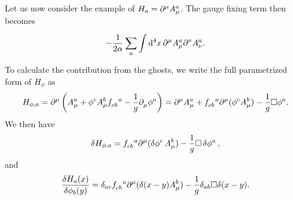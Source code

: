 Let us now consider the example of $H_{a} = \partial^{\mu}_{}A_{\mu}^{a}$. The gauge fixing term then becomes
\begin{align*}
-\frac{1}{2\alpha}\sum\limits_{a}\int\limits_{}^{}\dd[4]{x}\partial^{\mu}_{}A_{\mu}^{a}\partial^{\nu}_{}A_{\nu}^{a}.
\end{align*}
To calculate the contribution from the ghosts, we write the full parametrized form of $H_{\phi}$ as
\begin{align*}
H_{\phi, a} = \del{\mu}{}\left(A_{\mu}^{a} + \phi^{c}A_{\mu}^{b}\srconst{cb}{a} - \frac{1}{g}\del{}{\mu}\phi^{a}\right) = \del{\mu}{}A_{\mu}^{a} + \srconst{cb}{a}\del{\mu}{}(\phi^{c}A_{\mu}^{b}) - \frac{1}{g}\dalem\phi^{a}.
\end{align*}
We then have
\begin{align*}
\var{H_{\phi, a}} = \srconst{cb}{a}\del{\mu}{}(\var{\phi^{c}}A_{\mu}^{b}) - \frac{1}{g}\dalem\var{\phi^{a}},
\end{align*}
and
\begin{align*}
\fdv{H_{a}(x)}{\phi_{b}(y)} = \delta_{ac}\srconst{cb}{a}\del{\mu}{}(\delta(x - y)A_{\mu}^{b}) - \frac{1}{g}\delta_{ab}\dalem\delta(x - y).
\end{align*}